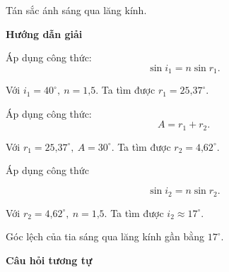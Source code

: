 \begin{dang}{Tán sắc ánh sáng qua lăng kính.}
	
	{	\begin{center}
			\textbf{Hướng dẫn giải}
		\end{center}
		
		Áp dụng công thức:
		\begin{equation*}
			\sin i_1=n\sin r_1.
		\end{equation*}
		
		Với $i_1=40^\circ,\ n=\text{1,5} $. Ta tìm được $r_1=\text{25,37}^\circ$.
		
		Áp dụng công thức:
		\begin{equation*}
			A=r_1+r_2.
		\end{equation*}
		
		Với $r_1=\text{25,37}^\circ,\ A=30^\circ$. Ta tìm được $r_2=\text{4,62}^\circ$.
		
		Áp dụng công thức
		
		\begin{equation*}
			\sin i_2=n\sin r_2.
		\end{equation*}
		
		Với $r_2=\text{4,62}^\circ,\ n=\text{1,5} $. Ta tìm được $i_2\approx \text{17}^\circ$.
		
		Góc lệch của tia sáng qua lăng kính gần bằng $\text{17}^\circ$.
		
		\begin{center}
			\textbf{Câu hỏi tương tự}
		\end{center}
		
}
\end{dang}
